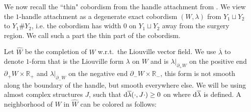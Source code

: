 \documentclass[11pt]{amsart}
\numberwithin{equation}{section}
\def\R{\mathbb{R}}
\def\rd{{\rm d}}
\begin{document}
We now recall the ``thin" cobordism from the handle attachment from \cite{+1}. We view the $1$-handle attachment as a degenerate exact cobordism $(W,\lambda)$ from $Y_1\sqcup Y_2$ to $Y_1\# Y_2$, i.e. the cobordism has width $0$ on $Y_1\sqcup Y_2$ away from the surgery region. We call such a part the thin part of the cobordism. 
\begin{figure}[H]
    \centering
\end{figure}
Let $\widehat{W}$ be the completion of $W$ w.r.t.\ the Liouville vector field. We use $\overline{\lambda}$ to denote $1$-form that is the Liouville form $\lambda$ on $W$ and is $\lambda|_{\partial_+W}$ on the positive end $\partial_+ W\times \R_+$ and $\lambda|_{\partial_-W}$ on the negative end $\partial_-W\times \R_-$, this form is not smooth along the boundary of the handle, but smooth everywhere else. We will be using almost complex structures $J$, such that $\rd \overline{\lambda} (\cdot,J\cdot)\ge 0$ on where $\rd \overline{\lambda}$ is defined.  A neighborhood of $W$ in $\widehat{W}$ can be colored as follows:
\end{document}

